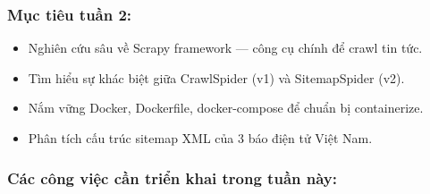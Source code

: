 \hypertarget{mux1ee5c-tiuxeau-tuux1ea7n-2}{%
\subsubsection{Mục tiêu tuần 2:}}

\begin{itemize}
\tightlist
\item
  Nghiên cứu sâu về Scrapy framework --- công cụ chính để crawl tin tức.
\item
  Tìm hiểu sự khác biệt giữa CrawlSpider (v1) và SitemapSpider (v2).
\item
  Nắm vững Docker, Dockerfile, docker-compose để chuẩn bị containerize.
\item
  Phân tích cấu trúc sitemap XML của 3 báo điện tử Việt Nam.
\end{itemize}

\hypertarget{cuxe1c-cuxf4ng-viux1ec7c-cux1ea7n-triux1ec3n-khai-trong-tuux1ea7n-nuxe0y}{%
\subsubsection{Các công việc cần triển khai trong tuần
này:}}

